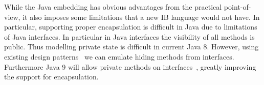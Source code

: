 
\begin{comment}
To evaluate the usefulness of object interfaces, we illustrate
\numOfCaseStudies \bruno{needs updates}\yanlin{updated}
applications. The first application is a simple
solution to the Expression Problem~\cite{wadler98expression}, supporting independent
extensibility~\cite{zenger05independentlyextensible}, and without boilerplate code. The second
application shows how embedded DSLs using fluent interfaces~\cite{fowler2005fluentinterface}
can be easily defined using object interfaces. The third
application is a case study for a simple Maze game implemented with
multiple inheritance. For this application we show that there is a
significant reduction in the number of lines of code when compared
to an existing implementation~\cite{bono14} using plain Java 8. The last
application is a relatively larger case study of refactoring of a simple interpreter, showing that our
approach can benefit modularity and scale to real code base. Noteworthy, the first three applications are implemented
without defining a single class! The last one contains several classes that cannot be
converted to interfaces due to the limitation of our implementation of \mixin.
\end{comment}

While the Java embedding has obvious advantages from the practical
point-of-view, it also imposes some limitations that a new IB language
would not have. In particular, supporting proper encapsulation is
difficult in Java due to limitations of Java interfaces. In particular
in Java interfaces the visibility of all methods is public. Thus
modelling private state is difficult in current Java 8. However,
 using existing design patterns~\cite{BettiniDSS13} we can emulate hiding
methods from interfaces. Furthermore Java 9 will allow private methods
on interfaces~\cite{srikanth16private}, greatly improving the support for
encapsulation.

